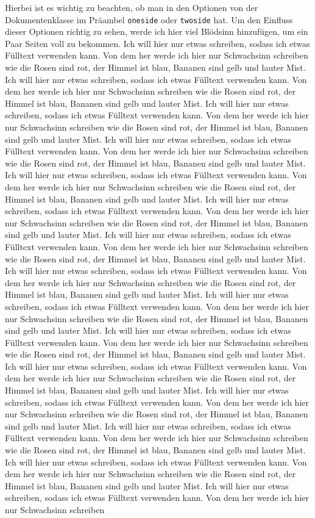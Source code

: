 Hierbei ist es wichtig zu beachten, ob man in den Optionen von der Dokumentenklasse im Präambel \verb=oneside= oder \verb=twoside= hat. Um den Einfluss dieser Optionen richtig zu sehen, werde ich hier viel Blödsinn hinzufügen, um ein Paar Seiten voll zu bekommen. Ich will hier nur etwas schreiben, sodass ich etwas Fülltext verwenden kann. Von dem her werde ich hier nur Schwachsinn schreiben wie die Rosen sind rot, der Himmel ist blau, Bananen sind gelb und lauter Mist. Ich will hier nur etwas schreiben, sodass ich etwas Fülltext verwenden kann. Von dem her werde ich hier nur Schwachsinn schreiben wie die Rosen sind rot, der Himmel ist blau, Bananen sind gelb und lauter Mist. Ich will hier nur etwas schreiben, sodass ich etwas Fülltext verwenden kann. Von dem her werde ich hier nur Schwachsinn schreiben wie die Rosen sind rot, der Himmel ist blau, Bananen sind gelb und lauter Mist. Ich will hier nur etwas schreiben, sodass ich etwas Fülltext verwenden kann. Von dem her werde ich hier nur Schwachsinn schreiben wie die Rosen sind rot, der Himmel ist blau, Bananen sind gelb und lauter Mist. Ich will hier nur etwas schreiben, sodass ich etwas Fülltext verwenden kann. Von dem her werde ich hier nur Schwachsinn schreiben wie die Rosen sind rot, der Himmel ist blau, Bananen sind gelb und lauter Mist. Ich will hier nur etwas schreiben, sodass ich etwas Fülltext verwenden kann. Von dem her werde ich hier nur Schwachsinn schreiben wie die Rosen sind rot, der Himmel ist blau, Bananen sind gelb und lauter Mist. Ich will hier nur etwas schreiben, sodass ich etwas Fülltext verwenden kann. Von dem her werde ich hier nur Schwachsinn schreiben wie die Rosen sind rot, der Himmel ist blau, Bananen sind gelb und lauter Mist. Ich will hier nur etwas schreiben, sodass ich etwas Fülltext verwenden kann. Von dem her werde ich hier nur Schwachsinn schreiben wie die Rosen sind rot, der Himmel ist blau, Bananen sind gelb und lauter Mist. Ich will hier nur etwas schreiben, sodass ich etwas Fülltext verwenden kann. Von dem her werde ich hier nur Schwachsinn schreiben wie die Rosen sind rot, der Himmel ist blau, Bananen sind gelb und lauter Mist. Ich will hier nur etwas schreiben, sodass ich etwas Fülltext verwenden kann. Von dem her werde ich hier nur Schwachsinn schreiben wie die Rosen sind rot, der Himmel ist blau, Bananen sind gelb und lauter Mist. Ich will hier nur etwas schreiben, sodass ich etwas Fülltext verwenden kann. Von dem her werde ich hier nur Schwachsinn schreiben wie die Rosen sind rot, der Himmel ist blau, Bananen sind gelb und lauter Mist. Ich will hier nur etwas schreiben, sodass ich etwas Fülltext verwenden kann. Von dem her werde ich hier nur Schwachsinn schreiben wie die Rosen sind rot, der Himmel ist blau, Bananen sind gelb und lauter Mist. Ich will hier nur etwas schreiben, sodass ich etwas Fülltext verwenden kann. Von dem her werde ich hier nur Schwachsinn schreiben wie die Rosen sind rot, der Himmel ist blau, Bananen sind gelb und lauter Mist. Ich will hier nur etwas schreiben, sodass ich etwas Fülltext verwenden kann. Von dem her werde ich hier nur Schwachsinn schreiben wie die Rosen sind rot, der Himmel ist blau, Bananen sind gelb und lauter Mist. Ich will hier nur etwas schreiben, sodass ich etwas Fülltext verwenden kann. Von dem her werde ich hier nur Schwachsinn schreiben 